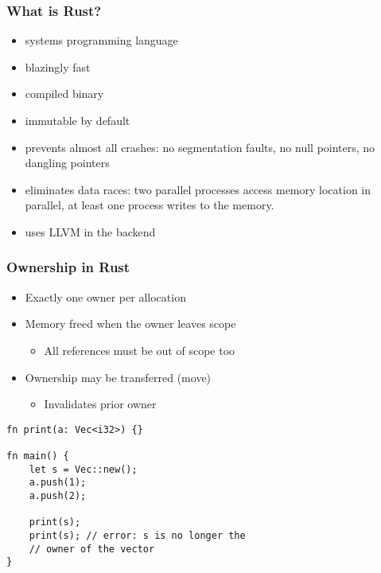 \documentclass{beamer} %
\begin{document}
\begin{frame}
\frametitle{What is Rust?}

\begin{itemize}
    \item systems programming language
    \item blazingly fast
    \item compiled binary
    \item immutable by default
    \item prevents almost all crashes: no segmentation faults, no null pointers, no dangling pointers
    \item eliminates data races: two parallel processes access memory location in parallel, at least one process writes to the memory.
    \item uses LLVM in the backend
\end{itemize}

\end{frame}

\begin{frame}[fragile]
\frametitle{Ownership in Rust}

\begin{itemize}
    \item Exactly one owner per allocation
    \item Memory freed when the owner leaves scope
    \begin{itemize}
    	\item All references must be out of scope too
    \end{itemize}
    \item Ownership may be transferred (move)
    \begin{itemize}
    	\item Invalidates prior owner
    \end{itemize}
\end{itemize}

\begin{lstlisting}
fn print(a: Vec<i32>) {}

fn main() {
    let s = Vec::new();
    a.push(1);
    a.push(2);
    
    print(s);
    print(s); // error: s is no longer the 
    // owner of the vector
}    
\end{lstlisting}

\end{frame}
\end{document}

